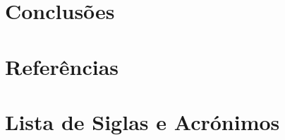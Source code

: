 \documentclass[a4paper]{report}
\begin{document}
\chapter{Conclusões}

\chapter{Referências}

\chapter{Lista de Siglas e Acrónimos}
\end{document}
